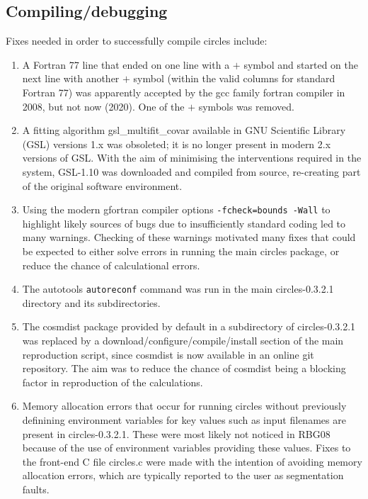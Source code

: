 \subsection{Compiling/debugging}

Fixes needed in order to successfully compile {\sc circles} include:
\begin{enumerate}
\item
  A Fortran 77 line that ended on one line with a $+$ symbol and
  started on the next line with another $+$ symbol (within the valid
  columns for standard Fortran 77) was apparently accepted by the {\sc
    gcc} family fortran compiler in 2008, but not now (2020). One of
  the $+$ symbols was removed.
\item
  A fitting algorithm {\sc gsl\_multifit\_covar} available in GNU
  Scientific Library ({\sc GSL}) versions 1.x was obsoleted; it is no
  longer present in modern 2.x versions of {\sc GSL}. With the aim of
  minimising the interventions required in the system, {\sc
    GSL-1.10} was downloaded and compiled from source, re-creating
  part of the original software environment.
\item
  Using the modern {\sc gfortran} compiler options {\tt -fcheck=bounds
    -Wall} to highlight likely sources of bugs due to insufficiently
  standard coding led to many warnings.  Checking of these warnings
  motivated many fixes that could be expected to either solve errors
  in running the main {\sc circles} package, or reduce the chance of
  calculational errors.
\item
  The autotools {\tt autoreconf} command was run in the main {\sc
    circles-0.3.2.1} directory and its subdirectories.
\item
  The {\sc cosmdist} package provided by default in a subdirectory of
  {\sc circles-0.3.2.1} was replaced by a
  download/configure/compile/install section of the main reproduction
  script, since {\sc cosmdist} is now available in an online
  git repository. The aim was to reduce the chance of {\sc cosmdist}
  being a blocking factor in reproduction of the calculations.
\item
  Memory allocation errors that occur for running {\sc circles}
  without previously definining environment variables for key
  values such as input filenames are present in {\sc
    circles-0.3.2.1}. These were most likely not noticed in RBG08
  because of the use of environment variables providing these
  values. Fixes to the front-end C file {\sc circles.c} were
  made with the intention of avoiding memory allocation errors,
  which are typically reported to the user as segmentation faults.
\end{enumerate}

